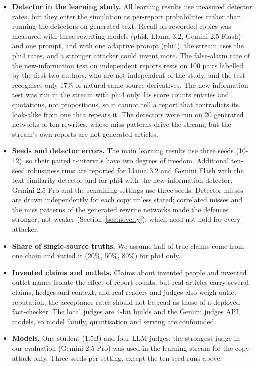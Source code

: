 \begin{itemize}
\tightlist
\item
  \textbf{Detector in the learning study.} All learning results use measured detector rates, but they enter the simulation as per-report probabilities rather than running the detectors on generated text. Recall on reworded copies was measured with three rewriting models (phi4, Llama 3.2, Gemini 2.5 Flash) and one prompt, and with one adaptive prompt (phi4); the stream uses the phi4 rates, and a stronger attacker could invent more. The false-alarm rate of the new-information test on independent reports rests on 100 pairs labelled by the first two authors, who are not independent of the study, and the test recognises only 17\% of natural same-source derivatives. The new-information test was run in the stream with phi4 only. Its score counts entities and quotations, not propositions, so it cannot tell a report that contradicts its look-alike from one that repeats it. The detectors were run on 20 generated networks of ten rewrites, whose miss patterns drive the stream, but the stream's own reports are not generated articles.
\item
  \textbf{Seeds and detector errors.} The main learning results use three seeds (10-12), so their paired t-intervals have two degrees of freedom. Additional ten-seed robustness runs are reported for Llama 3.2 and Gemini Flash with the text-similarity detector and for phi4 with the new-information detector; Gemini 2.5 Pro and the remaining settings use three seeds. Detector misses are drawn independently for each copy unless stated; correlated misses and the miss patterns of the generated rewrite networks made the defences stronger, not weaker (Section~\ref{sec:novelty}), which need not hold for every attacker.
\item
  \textbf{Share of single-source truths.} We assume half of true claims come from one chain and varied it (20\%, 50\%, 80\%) for phi4 only.
\item
  \textbf{Invented claims and outlets.} Claims about invented people and invented outlet names isolate the effect of report counts, but real articles carry several claims, hedges and context, and real readers and judges also weigh outlet reputation; the acceptance rates should not be read as those of a deployed fact-checker. The local judges are 4-bit builds and the Gemini judges API models, so model family, quantisation and serving are confounded.
\item
  \textbf{Models.} One student (1.5B) and four LLM judges; the strongest judge in our evaluation (Gemini 2.5 Pro) was used in the learning stream for the copy attack only. Three seeds per setting, except the ten-seed runs above.

\end{itemize}
